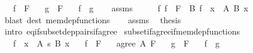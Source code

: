 \begin{isabellebody}
\ \ \ {\isachardoublequoteopen}f\ {\isasymin}\ F{\isachardoublequoteclose}\isanewline
\ \ \ {\isachardoublequoteopen}g\ {\isasymin}\ F{\isachardoublequoteclose}\isanewline
\ \ \ {\isachardoublequoteopen}f\ {\isacharequal}{\kern0pt}\ g{\isachardoublequoteclose}\isanewline
%
\isadelimproof
\ \ %
\endisadelimproof
%
\isatagproof
{}\isamarkupfalse%
\ assms\isanewline
{}\isamarkupfalse%
\ {\isacharminus}{\kern0pt}\isanewline
\ \ \isamarkupfalse%
\ {\isachardoublequoteopen}{\isasymAnd}f{\isachardot}{\kern0pt}\ f\ {\isasymin}\ F\ {\isasymLongrightarrow}\ {\isasymexists}B{\isachardot}{\kern0pt}\ f\ {\isasymsubseteq}\ {\isasymSum}x\ {\isasymin}\ A{\isachardot}{\kern0pt}\ {\isacharparenleft}{\kern0pt}B\ x{\isacharparenright}{\kern0pt}{\isachardoublequoteclose}\ \isamarkupfalse%
\ {\isacharparenleft}{\kern0pt}blast\ dest{\isacharcolon}{\kern0pt}\ mem{\isacharunderscore}{\kern0pt}dep{\isacharunderscore}{\kern0pt}functions{\isacharparenright}{\kern0pt}\isanewline
\ \ \isamarkupfalse%
\ assms\ \isamarkupfalse%
\ {\isacharquery}{\kern0pt}thesis\ \isamarkupfalse%
\ {\isacharparenleft}{\kern0pt}intro\ eq{\isacharunderscore}{\kern0pt}if{\isacharunderscore}{\kern0pt}subset{\isacharunderscore}{\kern0pt}dep{\isacharunderscore}{\kern0pt}pairs{\isacharunderscore}{\kern0pt}if{\isacharunderscore}{\kern0pt}agree{\isacharparenright}{\kern0pt}\isanewline
{}\isamarkupfalse%
%
\endisatagproof
{\isafoldproof}%
%
\isadelimproof
\isanewline
%
\endisadelimproof
\isanewline
{}\isamarkupfalse%
\ subset{\isacharunderscore}{\kern0pt}if{\isacharunderscore}{\kern0pt}agree{\isacharunderscore}{\kern0pt}if{\isacharunderscore}{\kern0pt}mem{\isacharunderscore}{\kern0pt}dep{\isacharunderscore}{\kern0pt}functions{\isacharcolon}{\kern0pt}\isanewline
\ \ \ {\isachardoublequoteopen}f\ {\isasymin}\ {\isacharparenleft}{\kern0pt}x\ {\isasymin}\ A{\isacharparenright}{\kern0pt}\ {\isasymrightarrow}s\ {\isacharparenleft}{\kern0pt}B\ x{\isacharparenright}{\kern0pt}{\isachardoublequoteclose}\isanewline
\ \ \ {\isachardoublequoteopen}f\ {\isasymin}\ F{\isachardoublequoteclose}\isanewline
\ \ \ {\isachardoublequoteopen}agree\ A\ F{\isachardoublequoteclose}\isanewline
\ \ \ {\isachardoublequoteopen}g\ {\isasymin}\ F{\isachardoublequoteclose}\isanewline
\ \ \ {\isachardoublequoteopen}f\ {\isasymsubseteq}\ g{\isachardoublequoteclose}\isanewline

\end{isabellebody}
